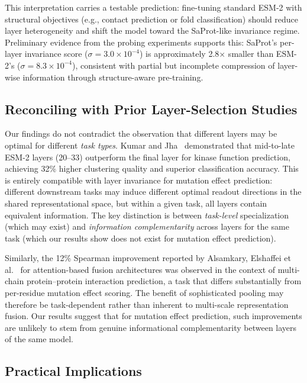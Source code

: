 \documentclass[11pt,a4paper]{article}
\begin{document}
This interpretation carries a testable prediction: fine-tuning standard ESM-2
with structural objectives (e.g., contact prediction or fold classification)
should reduce layer heterogeneity and shift the model toward the SaProt-like
invariance regime. Preliminary evidence from the probing experiments supports
this: SaProt's per-layer invariance score ($\sigma = 3.0 \times 10^{-4}$) is
approximately 2.8$\times$ smaller than ESM-2's ($\sigma = 8.3 \times 10^{-4}$),
consistent with partial but incomplete compression of layer-wise information
through structure-aware pre-training.

\subsection{Reconciling with Prior Layer-Selection Studies}

Our findings do not contradict the observation that different layers may be
optimal for different \emph{task types}. Kumar and Jha~\cite{kumar2025}
demonstrated that mid-to-late ESM-2 layers (20--33) outperform the final layer
for kinase function prediction, achieving 32\% higher clustering quality and
superior classification accuracy. This is entirely compatible with layer
invariance for mutation effect prediction: different downstream tasks may induce
different optimal readout directions in the shared representational space, but
within a given task, all layers contain equivalent information. The key
distinction is between \emph{task-level} specialization (which may exist) and
\emph{information complementarity} across layers for the same task (which our
results show does not exist for mutation effect prediction).

Similarly, the 12\% Spearman improvement reported by Alsamkary, Elshaffei
et al.~\cite{elshaffei2025} for attention-based fusion architectures was
observed in the context of multi-chain protein--protein interaction prediction,
a task that differs substantially from per-residue mutation effect scoring.
The benefit of sophisticated pooling may therefore be task-dependent rather than
inherent to multi-scale representation fusion. Our results suggest that for
mutation effect prediction, such improvements are unlikely to stem from
genuine informational complementarity between layers of the same model.

\subsection{Practical Implications}
\end{document}
